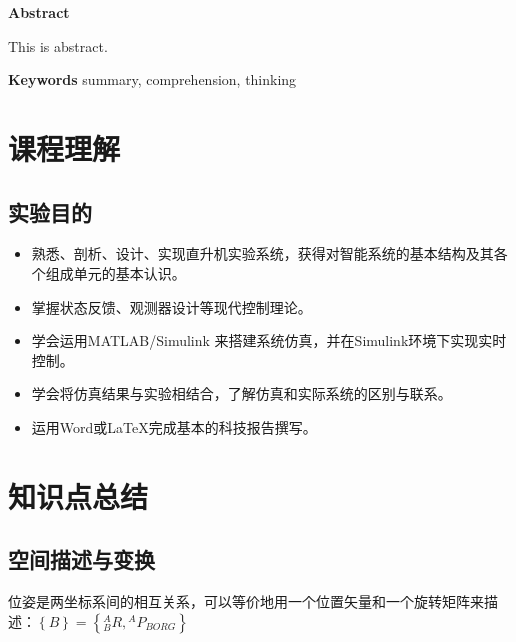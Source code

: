 \documentclass[a4paper,12pt]{paper}
\begin{document}
\newpage

\begin{center}
    \textbf{Abstract}
\end{center}

This is abstract.
\vspace*{15em}

\textbf{Keywords } summary, comprehension, thinking


\newpage
\tableofcontents %
\newpage

\chapter{课程理解}
\setcounter{page}{1}

\section{实验目的}

\begin{itemize}
    \item 熟悉、剖析、设计、实现直升机实验系统，获得对智能系统的基本结构及其各个组成单元的基本认识。
    \item 掌握状态反馈、观测器设计等现代控制理论。
    \item 学会运用MATLAB/Simulink 来搭建系统仿真，并在Simulink环境下实现实时控制。
    \item 学会将仿真结果与实验相结合，了解仿真和实际系统的区别与联系。
    \item 运用Word或\LaTeX 完成基本的科技报告撰写。
\end{itemize}

\chapter{知识点总结} 

\section{空间描述与变换}

\begin{definition}[位姿]
    位姿是两坐标系间的相互关系，可以等价地用一个位置矢量和一个旋转矩阵来描述：$\left\{ B \right\} = \left\{ {{}_B^AR,{}^A{P_{BORG}}} \right\}$
\end{definition}
\end{document}
